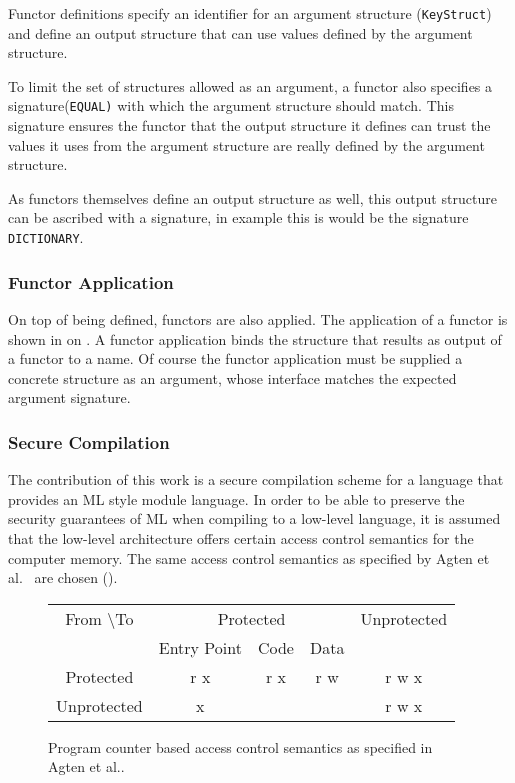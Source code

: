 \documentclass[11pt]{article}
\begin{document}
Functor definitions specify an identifier for an argument structure (\lstinline{KeyStruct}) and define an output structure that can use values defined by the argument structure. 

To limit the set of structures allowed as an argument, a functor also specifies a signature(\lstinline{EQUAL)} with which the argument structure should match.
This signature ensures the functor that the output structure it defines can trust the values it uses from the argument structure are really defined by the argument structure.

As functors themselves define an output structure as well, this output structure can be ascribed with a signature, in example  this is would be the signature \lstinline{DICTIONARY}.

\subsubsection{Functor Application}
On top of being defined, functors are also applied.
The application of a functor is shown in  on .
A functor application binds the structure that results as output of a functor to a name.
Of course the functor application must be supplied a concrete structure as an argument, whose interface matches the expected argument signature.

\subsubsection{Secure Compilation}

The contribution of this work is a secure compilation scheme for a language that provides an ML style module language.
In order to be able to preserve the security guarantees of ML when compiling to a low-level language, it is assumed that the low-level architecture offers certain access control semantics for the computer memory.
The same access control semantics as specified by Agten et al.~\cite{Agten:2012:SCM:2354412.2355247} are chosen ().

\begin{figure}[htb]
    \centering
	\begin{tabular}{|c|c|c|c|c|}
		\hline
		From \textbackslash To & \multicolumn{3}{c|}{Protected} & Unprotected \\
		& Entry Point & Code & Data & \\ \hline
		Protected & r x & r x & r w & r w x \\ \hline
		Unprotected & x & & & r w x \\ \hline
	\end{tabular}
    \caption[PCBAC Semantics]{Program counter based access control semantics as specified in Agten et al.\cite{Agten:2012:SCM:2354412.2355247}. \label{fig:PCBAC}}
\end{figure}
\end{document}
